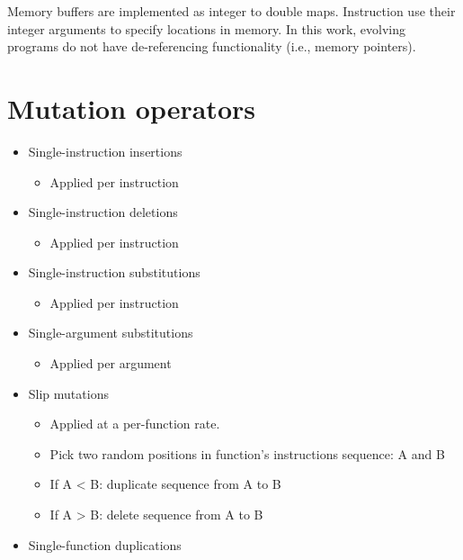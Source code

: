 \documentclass[]{book}
\providecommand{\tightlist}{%
  \setlength{\itemsep}{0pt}\setlength{\parskip}{0pt}}
\begin{document}
Memory buffers are implemented as integer to double maps. Instruction use their integer arguments to specify locations in memory.
In this work, evolving programs do not have de-referencing functionality (i.e., memory pointers).

\hypertarget{mutation-operators}{%
\section{Mutation operators}\label{mutation-operators}}

\begin{itemize}
\tightlist
\item
  Single-instruction insertions

  \begin{itemize}
  \tightlist
  \item
    Applied per instruction
  \end{itemize}
\item
  Single-instruction deletions

  \begin{itemize}
  \tightlist
  \item
    Applied per instruction
  \end{itemize}
\item
  Single-instruction substitutions

  \begin{itemize}
  \tightlist
  \item
    Applied per instruction
  \end{itemize}
\item
  Single-argument substitutions

  \begin{itemize}
  \tightlist
  \item
    Applied per argument
  \end{itemize}
\item
  Slip mutations \citep{lalejini_gene_2017}

  \begin{itemize}
  \tightlist
  \item
    Applied at a per-function rate.
  \item
    Pick two random positions in function's instructions sequence: A and B
  \item
    If A \textless{} B: duplicate sequence from A to B
  \item
    If A \textgreater{} B: delete sequence from A to B
  \end{itemize}
\item
  Single-function duplications


\end{itemize}
\end{document}
